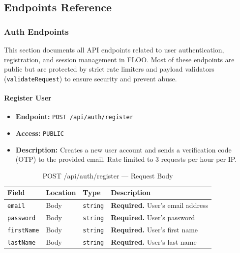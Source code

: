 \subsection{Endpoints Reference}
\subsubsection{Auth Endpoints}
\label{subsec:auth-endpoints}

This section documents all API endpoints related to user authentication, registration, and session management in FLOO. Most of these endpoints are public but are protected by strict rate limiters and payload validators (\texttt{validateRequest}) to ensure security and prevent abuse.

\paragraph{Register User}
\label{subsubsec:register-user}

\begin{itemize}
  \item \textbf{Endpoint:} \texttt{POST /api/auth/register}
  \item \textbf{Access:} \texttt{PUBLIC}
  \item \textbf{Description:} Creates a new user account and sends a verification code (OTP) to the provided email. Rate limited to 3 requests per hour per IP.
\end{itemize}

\begin{table}[H]
\centering
\renewcommand{\arraystretch}{1.3}
\begin{tabularx}{\textwidth}{|l|l|l|X|}
\hline
\textbf{Field} & \textbf{Location} & \textbf{Type} & \textbf{Description} \\
\hline
\texttt{email}     & Body & \texttt{string} & \textbf{Required.} User's email address \\
\hline
\texttt{password}  & Body & \texttt{string} & \textbf{Required.} User's password \\
\hline
\texttt{firstName} & Body & \texttt{string} & \textbf{Required.} User's first name \\
\hline
\texttt{lastName}  & Body & \texttt{string} & \textbf{Required.} User's last name \\
\hline
\end{tabularx}
\caption{POST /api/auth/register — Request Body}
\label{tab:register-body}
\end{table}

